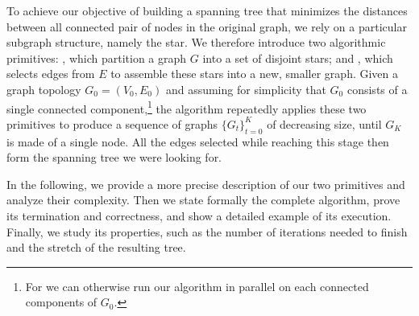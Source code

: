 To achieve our objective of building a spanning tree that minimizes the distances between all
connected pair of nodes in the original graph, we rely on a particular subgraph structure, namely
the star.  We therefore introduce two algorithmic primitives: \extractStar{}, which partition a
graph $G$ into a set of disjoint stars; and \collapseStar{}, which selects edges from $E$ to
assemble these stars into a new, smaller graph. Given a graph topology $G_0=(V_0, E_0)$ and assuming
for simplicity that $G_0$ consists of a single connected component,\footnote{For we can otherwise
run our algorithm in parallel on each connected components of $G_0$.} the \gtx{} algorithm
repeatedly applies these two primitives to produce a sequence of graphs $\{G_t\}_{t=0}^K$ of
decreasing size, until $G_K$ is made of a single node. All the edges selected while reaching
this stage then form the spanning tree we were looking for.

In the following, we provide a more precise description of our two primitives and analyze their
complexity. Then we state formally the complete \gtx{} algorithm, prove its termination and
correctness, and show a detailed example of its execution.  Finally, we study its properties, such
as the number of iterations needed to finish and the stretch of the resulting tree.

